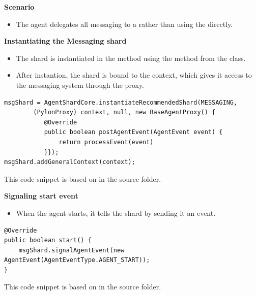 \documentclass[10pt,aspectratio=169]{beamer}
\begin{document}
\begin{frame}[fragile]

\textbf{Scenario}

\begin{itemize}
    \item The agent delegates all messaging to a  rather than using the  directly.
\end{itemize}

\textbf{Instantiating the Messaging shard} 

\begin{itemize}
    \item The shard is instantiated in the  method using the  method from the  class.
    \item After instantion, the shard is bound to the context, which gives it access to the messaging system through the proxy.
\end{itemize}

\begin{lstlisting}
msgShard = AgentShardCore.instantiateRecommendedShard(MESSAGING,
		(PylonProxy) context, null, new BaseAgentProxy() {
		   @Override
		   public boolean postAgentEvent(AgentEvent event) {
			   return processEvent(event)
		   }});
msgShard.addGeneralContext(context);
\end{lstlisting}

{\small This code snippet is based on  in the  source folder.}


\end{frame}

\begin{frame}[fragile]

\textbf{Signaling start event} 

\begin{itemize}
    \item When the agent starts, it tells the shard by sending it an  event.
\end{itemize}

\begin{lstlisting}
@Override
public boolean start() {
    msgShard.signalAgentEvent(new AgentEvent(AgentEventType.AGENT_START));
}
\end{lstlisting}

{\small This code snippet is based on  in the  source folder.}

\end{frame}
\end{document}

